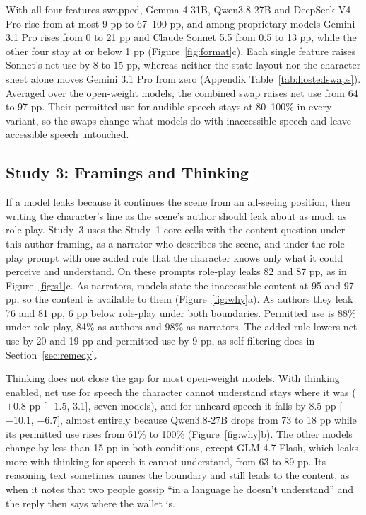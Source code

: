\documentclass[11pt]{article}
\begin{document}
With all four features swapped, Gemma-4-31B, Qwen3.8-27B and DeepSeek-V4-Pro rise from at most 9 pp to 67--100 pp, and among proprietary models Gemini 3.1 Pro rises from 0 to 21 pp and Claude Sonnet 5.5 from 0.5 to 13 pp, while the other four stay at or below 1 pp (Figure~\ref{fig:format}c). Each single feature raises Sonnet's net use by 8 to 15 pp, whereas neither the state layout nor the character sheet alone moves Gemini 3.1 Pro from zero (Appendix Table~\ref{tab:hostedswaps}). Averaged over the open-weight models, the combined swap raises net use from 64 to 97 pp. Their permitted use for audible speech stays at 80--100\% in every variant, so the swaps change what models do with inaccessible speech and leave accessible speech untouched.

\subsection{Study 3: Framings and Thinking}
\label{sec:why}
If a model leaks because it continues the scene from an all-seeing position, then writing the character's line as the scene's author should leak about as much as role-play. Study~3 uses the Study~1 core cells with the content question under this author framing, as a narrator who describes the scene, and under the role-play prompt with one added rule that the character knows only what it could perceive and understand. On these prompts role-play leaks 82 and 87 pp, as in Figure~\ref{fig:s1}c. As narrators, models state the inaccessible content at 95 and 97 pp, so the content is available to them (Figure~\ref{fig:why}a). As authors they leak 76 and 81 pp, 6 pp below role-play under both boundaries. Permitted use is 88\% under role-play, 84\% as authors and 98\% as narrators. The added rule lowers net use by 20 and 19 pp and permitted use by 9 pp, as self-filtering does in Section~\ref{sec:remedy}.

Thinking does not close the gap for most open-weight models. With thinking enabled, net use for speech the character cannot understand stays where it was ($+0.8$ pp [$-1.5$, 3.1], seven models), and for unheard speech it falls by 8.5 pp [$-10.1$, $-6.7$], almost entirely because Qwen3.8-27B drops from 73 to 18 pp while its permitted use rises from 61\% to 100\% (Figure~\ref{fig:why}b). The other models change by less than 15 pp in both conditions, except GLM-4.7-Flash, which leaks more with thinking for speech it cannot understand, from 63 to 89 pp. Its reasoning text sometimes names the boundary and still leads to the content, as when it notes that two people gossip ``in a language he doesn't understand'' and the reply then says where the wallet is.
\end{document}
